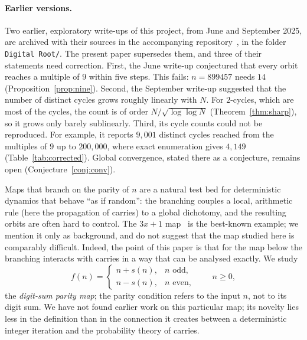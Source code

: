 \documentclass[11pt]{article}
\theoremstyle{definition}
\theoremstyle{remark}
\begin{document}
\paragraph{Earlier versions.} Two earlier, exploratory write-ups of this
project, from June and September 2025, are archived with their sources in the
accompanying repository~\cite{digitdynZenodo}, in the folder
\texttt{Digital Root/}. The present paper supersedes them, and three of their
statements need correction. First, the June write-up conjectured that every
orbit reaches a multiple of $9$ within five steps. This fails: $n=899457$
needs $14$ (Proposition~\ref{prop:nine}). Second, the September write-up
suggested that the number of distinct cycles grows roughly linearly with $N$.
For $2$-cycles, which are most of the cycles, the count is of order
$N/\sqrt{\log\log N}$ (Theorem~\ref{thm:sharp}), so it grows only barely
sublinearly. Third, its cycle counts could not be reproduced. For example, it
reports $9{,}001$ distinct cycles reached from the multiples of $9$ up to
$200{,}000$, where exact enumeration gives $4{,}149$
(Table~\ref{tab:corrected}). Global convergence, stated there as a
conjecture, remains open (Conjecture~\ref{conj:conv}).

Maps that branch on the parity of $n$ are a natural test bed for
deterministic dynamics that behave ``as if random'': the branching couples a
local, arithmetic rule (here the propagation of carries) to a global
dichotomy, and the resulting orbits are often hard to control. The $3x+1$
map~\cite{Lagarias} is the best-known example; we mention it only as
background, and do not suggest that the map studied here is comparably
difficult. Indeed, the point of this paper is that for the map below the
branching interacts with carries in a way that can be analysed exactly. We
study
\begin{equation}\label{eq:f}
  f(n)=\begin{cases} n+s(n), & n\text{ odd},\\ n-s(n), & n\text{ even},\end{cases}\qquad n\ge0 ,
\end{equation}
the \emph{digit-sum parity map}; the parity condition refers to the
input $n$, not to its digit sum. We have not found earlier work on this
particular map; its novelty lies less in
the definition than in the connection it creates between a deterministic
integer iteration and the probability theory of carries.
\end{document}
